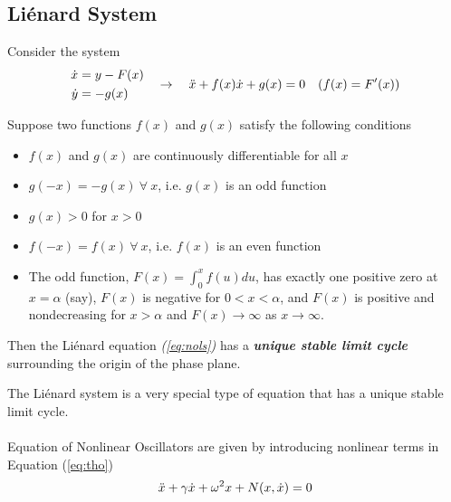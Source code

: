\subsection{Li\'enard System}
Consider the system
\begin{equation}{\label{eq:nols}}
	\begin{aligned}
		\dot{x}&=y-F(x)\\
		\dot{y}&=-g(x)
	\end{aligned}\quad\rightarrow\quad
	\ddot{x}+f(x)\dot{x}+g(x)=0\quad(f(x)=F^\prime(x))
\end{equation}
\begin{theorem}
	Suppose two functions $f(x)$ and $g(x)$ satisfy the following conditions
	\begin{itemize}
		\item $f(x)$ and $g(x)$ are continuously differentiable for all $x$
		\item $g(-x)=-g(x)\ \forall\ x$, i.e. $g(x)$ is an odd function
		\item $g(x)>0$ for $x>0$
		\item $f(-x)=f(x)\ \forall\ x$, i.e. $f(x)$ is an even function
		\item The odd function, $F(x)=\displaystyle\int_0^xf(u)du$, has exactly one positive zero at $x=\alpha$ (say), $F(x)$ is negative for $0<x<\alpha$, and $F(x)$ is positive and nondecreasing for $x>\alpha$ and $F(x)\rightarrow\infty$ as $x\rightarrow\infty$.
	\end{itemize}
	Then the Li\'enard equation \emph{(\ref{eq:nols})} has a \emph{\textbf{unique stable limit cycle}} surrounding the origin of the phase plane.
\end{theorem}
The Li\'enard system is a very special type of equation that has a unique stable
limit cycle.\\\\
Equation of Nonlinear Oscillators are given by introducing nonlinear terms in Equation (\ref{eq:tho})
\begin{equation}{\label{eq:nlo}}
	\ddot{x}+\gamma\dot{x}+\omega^2x+N(x,\dot{x})=0
\end{equation}
